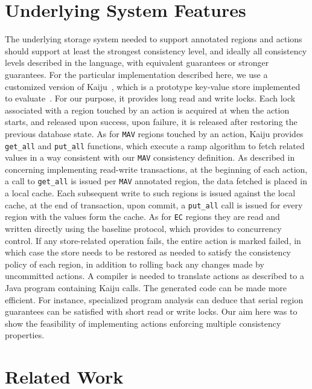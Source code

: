 \documentclass[preprint,numbers]{sigplanconf}
\begin{document}
\section{Underlying System Features}
The underlying storage system needed to support annotated regions and actions should
support at least the strongest consistency level, and ideally all consistency
levels described in the language, with equivalent guarantees or stronger
guarantees. For the particular
implementation described here, we use a customized
version of Kaiju~\cite{kaiju}, which is a prototype key-value store implemented to
evaluate~\cite{bailis2014scalable}. For our purpose, it provides long read and
write locks. Each lock associated with a region touched by an action is acquired
at when the action starts, and released upon success, upon failure, it is
released after restoring the previous database state. As for \texttt{MAV}
regions touched by an action, Kaiju provides
\texttt{get\_all} and \texttt{put\_all} functions, which execute a ramp algorithm
to fetch related values in a way consistent with our \texttt{MAV} consistency
definition. As described in ~\cite{bailis2014scalable} concerning implementing
read-write transactions, at the beginning of each action, a call to
\texttt{get\_all} is issued per \texttt{MAV} annotated region, the data fetched
is placed in a local cache. Each subsequent write to such regions is issued
against the local cache, at the end of transaction, upon commit, a
\texttt{put\_all} call
is issued for every region with the values form the cache. As for \texttt{EC}
regions they are read and written directly using the baseline protocol, which
provides to concurrency control. If any store-related operation fails, the
entire action is marked failed, in which case the store needs to be restored as
needed to satisfy the consistency policy of each region, in addition to rolling
back any changes made by uncommitted actions. A compiler is needed to translate
actions as described to a Java program containing Kaiju calls. The generated code can be made more 
efficient. For instance, specialized program analysis can deduce that serial 
region guarantees can be  satisfied with short read or write locks. Our aim here
was to show the feasibility of implementing actions enforcing multiple
consistency properties. 

\section{Related Work}
\end{document}
